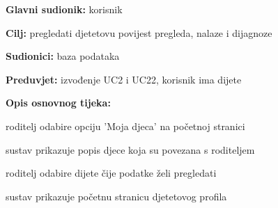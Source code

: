                     \noindent {}
					\begin{packed_item}
	
						\item \textbf{Glavni sudionik: }korisnik
						\item  \textbf{Cilj:} pregledati djetetovu povijest pregleda, nalaze i dijagnoze
						\item  \textbf{Sudionici:} baza podataka
						\item  \textbf{Preduvjet:} izvođenje UC2 i UC22, korisnik ima dijete
						\item  \textbf{Opis osnovnog tijeka:}
						
						\item[] \begin{packed_enum}
		
							\item roditelj odabire opciju 'Moja djeca' na početnoj stranici
							\item sustav prikazuje popis djece koja su povezana s roditeljem
							\item roditelj odabire dijete čije podatke želi pregledati
							\item sustav prikazuje početnu stranicu djetetovog profila
							
						\end{packed_enum}
						
					\end{packed_item}

